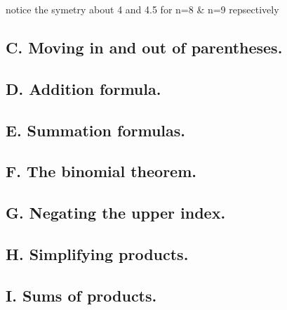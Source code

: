 \documentclass{article}
\begin{document}
  notice the symetry about 4 and 4.5 for n=8 & n=9 repsectively
\subsection*{C. Moving in and out of parentheses.}
\subsection*{D. Addition formula.}
\subsection*{E. Summation formulas.}
\subsection*{F. The binomial theorem.}
\subsection*{G. Negating the upper index.}
\subsection*{H. Simplifying products.}
\subsection*{I. Sums of products.}
\end{document}
